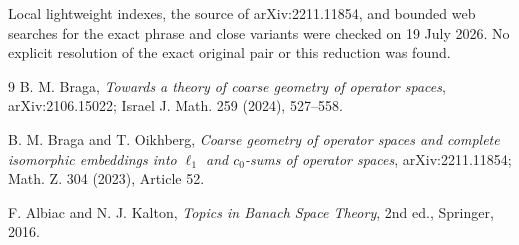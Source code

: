 \documentclass[11pt]{article}
\begin{document}
Local lightweight indexes, the source of arXiv:2211.11854, and bounded web
searches for the exact phrase and close variants were checked on 19 July 2026.
No explicit resolution of the exact original pair or this reduction was
found.

\begin{thebibliography}{9}
B. M. Braga,
\emph{Towards a theory of coarse geometry of operator spaces},
arXiv:2106.15022; Israel J. Math. 259 (2024), 527--558.

B. M. Braga and T. Oikhberg,
\emph{Coarse geometry of operator spaces and complete isomorphic embeddings
into $\ell_1$ and $c_0$-sums of operator spaces},
arXiv:2211.11854; Math. Z. 304 (2023), Article 52.

F. Albiac and N. J. Kalton,
\emph{Topics in Banach Space Theory}, 2nd ed., Springer, 2016.
\end{thebibliography}
\end{document}
